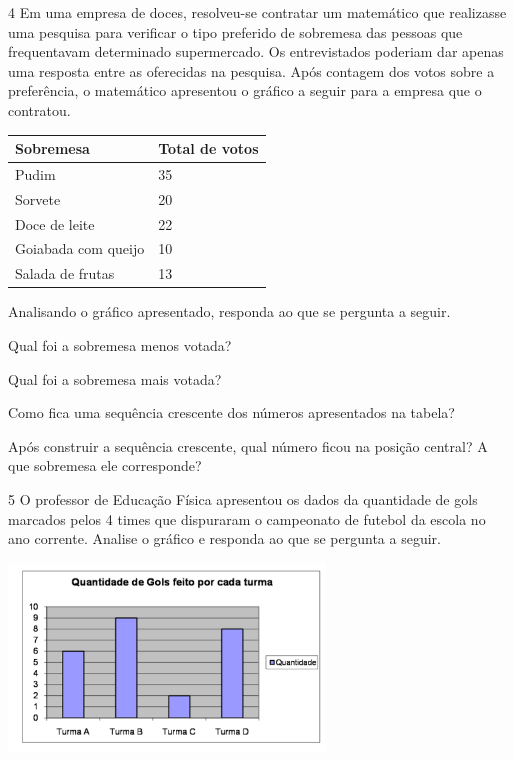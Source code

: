 \begin{mdframed}[linewidth=2pt,linecolor=salmao,roundcorner=2pt]
\begin{escolha}
{%

\num{4} Em uma empresa de doces, resolveu-se contratar um matemático que realizasse uma
pesquisa para verificar o tipo preferido de sobremesa das pessoas que
frequentavam determinado supermercado. Os entrevistados poderiam dar
apenas uma resposta entre as oferecidas na pesquisa. Após contagem dos
votos sobre a preferência, o matemático apresentou o gráfico a seguir
para a empresa que o contratou.

\begin{longtable}[]{@{}ll@{}}
\toprule
Sobremesa & Total de votos\tabularnewline
\midrule
\endhead
Pudim & 35\tabularnewline
Sorvete & 20\tabularnewline
Doce de leite & 22\tabularnewline
Goiabada com queijo & 10\tabularnewline
Salada de frutas & 13\tabularnewline
\bottomrule
\end{longtable}

Analisando o gráfico apresentado, responda ao que se pergunta a seguir.

\begin{escolha}
\item
  Qual foi a sobremesa menos votada?


\item
  Qual foi a sobremesa mais votada?


\item
  Como fica uma sequência crescente dos números apresentados na tabela?


\item
  Após construir a sequência crescente, qual número ficou na posição
  central? A que sobremesa ele corresponde?

\end{escolha}

\num{5} O professor de Educação Física apresentou os dados da quantidade de gols
marcados pelos 4 times que dispuraram o campeonato de futebol da escola no ano
corrente. Analise o gráfico e responda ao que se pergunta a seguir.

\includegraphics[width=3.30769in,height=1.97201in]{media/image97.png}

}
\end{escolha}
\end{mdframed}
